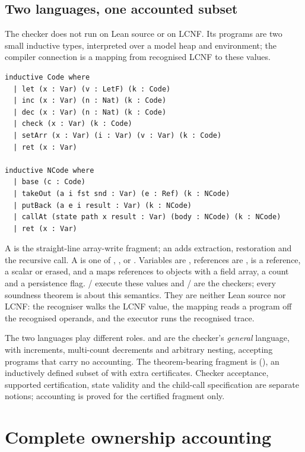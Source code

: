 \documentclass[a4paper,UKenglish,cleveref]{lipics-v2021}
\begin{document}
\subsection{Two languages, one accounted subset}
\label{sec:languages}
The checker does not run on Lean source or on LCNF. Its programs are two small
inductive types, interpreted over a model heap and environment; the compiler
connection is a mapping from recognised LCNF to these values.
\begin{samepage}
\begin{lstlisting}[basicstyle=\footnotesize\ttfamily]
inductive Code where
  | let (x : Var) (v : LetF) (k : Code)
  | inc (x : Var) (n : Nat) (k : Code)
  | dec (x : Var) (n : Nat) (k : Code)
  | check (x : Var) (k : Code)
  | setArr (x : Var) (i : Var) (v : Var) (k : Code)
  | ret (x : Var)

inductive NCode where
  | base (c : Code)
  | takeOut (a i fst snd : Var) (e : Ref) (k : NCode)
  | putBack (a e i result : Var) (k : NCode)
  | callAt (state path x result : Var) (body : NCode) (k : NCode)
  | ret (x : Var)
\end{lstlisting}
\end{samepage}
A  is the straight-line array-write fragment; an  adds
extraction, restoration and the recursive call. A  is one of
, ,  or . Variables
are , references are ,  is a reference, a scalar or
erased, and a  maps references to objects with a field array, a count
and a persistence flag. / execute these values and
/ are the checkers; every soundness theorem is about this
semantics. They are neither Lean source nor LCNF: the recogniser walks the LCNF
value, the mapping reads a program off the recognised operands, and the executor
runs the recognised trace.

The two languages play different roles.  and  are the
checker's \emph{general} language, with increments, multi-count decrements and
arbitrary nesting, accepting programs that carry no accounting.
The theorem-bearing fragment is  (), an
inductively defined subset of  with extra certificates. Checker
acceptance, supported certification, state validity and the child-call
specification are separate notions; accounting is proved for the certified fragment only.

\section{Complete ownership accounting}\label{sec:accounting}
\end{document}
